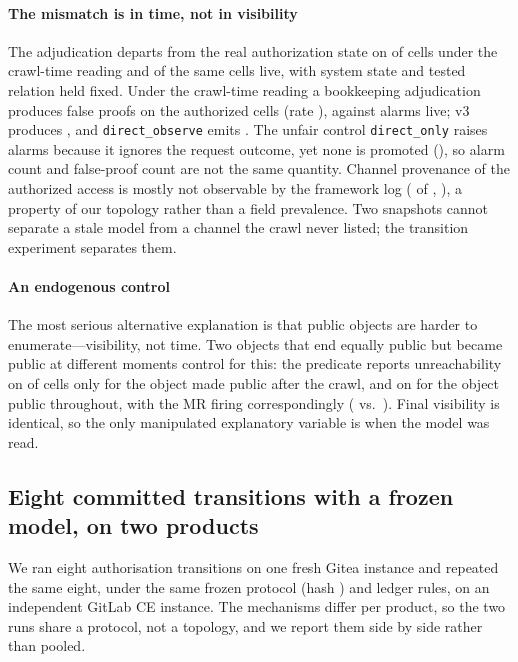 \paragraph{The mismatch is in time, not in visibility}
The adjudication departs from the real authorization state on \ResRsMismatchSnapshot{} of
\ResRsMismatchDenom{} cells under the crawl-time reading and \ResRsMismatchLive{} of the same
cells live, with system state and tested relation held fixed. Under the crawl-time reading a
bookkeeping adjudication produces \ResRsMrBookkeepingFp{} false proofs on the
\ResRsAuthorizedCells{} authorized cells (rate \ResRsMrBookkeepingFpRate{}), against
\ResRsMrBookkeepingAlarmsLive{} alarms live; v3 produces \ResRsVThreeFp{}, and
\texttt{direct\_observe} emits \ResRsDirectObserveFp{}. The unfair control
\texttt{direct\_only} raises \ResRsDirectOnlyAlarms{} alarms because it ignores the request
outcome, yet none is promoted (\ResRsDirectOnlyFp{}), so alarm count and false-proof count are
not the same quantity. Channel provenance of the authorized access is mostly not observable by
the framework log (\ResRsChannelNotObservable{} of \ResRsChannelAuthorizedTotal{},
\ResRsChannelNotObservableRate{}), a property of our topology rather than a field prevalence.
Two snapshots cannot separate a stale model from a channel the crawl never listed; the
transition experiment separates them.

\paragraph{An endogenous control}
The most serious alternative explanation is that public objects are harder to
enumerate---visibility, not time. Two objects that end equally public but became public at
different moments control for this: the predicate reports unreachability on
\ResRsEndoAfterCrawlReach{} of \ResRsEndoAfterCrawlCells{} cells only for the object made
public after the crawl, and on \ResRsEndoFromStartReach{} for the object public throughout,
with the MR firing correspondingly (\ResRsEndoAfterCrawlFires{} vs.~\ResRsEndoFromStartFires{}).
Final visibility is identical, so the only manipulated explanatory variable is when the model
was read.

\subsection{Eight committed transitions with a frozen model, on two products}
\label{sec:temporal}

We ran eight authorisation transitions on one fresh Gitea \TmpVersion{} instance and repeated
the same eight, under the same frozen protocol (hash \texttt{\TmpProtocol}) and ledger rules,
on an independent GitLab CE \TmpGVersion{} instance. The mechanisms differ per product, so the
two runs share a protocol, not a topology, and we report them side by side rather than pooled.

